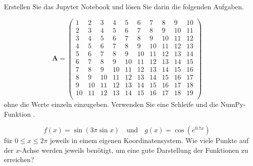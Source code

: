 \documentclass[12pt,parskip=full]{scrartcl}
\begin{document}

Erstellen Sie das Jupyter Notebook \uebdatei{} und lösen Sie darin die folgenden Aufgaben.

  \begin{displaymath}
    \mathbf{A}
    =
    \begin{pmatrix}
     1 &     2 &     3 &     4 &     5 &     6 &     7 &     8 &     9 &    10 \\
     2 &     3 &     4 &     5 &     6 &     7 &     8 &     9 &    10 &    11 \\
     3 &     4 &     5 &     6 &     7 &     8 &     9 &    10 &    11 &    12 \\
     4 &     5 &     6 &     7 &     8 &     9 &    10 &    11 &    12 &    13 \\
     5 &     6 &     7 &     8 &     9 &    10 &    11 &    12 &    13 &    14 \\
     6 &     7 &     8 &     9 &    10 &    11 &    12 &    13 &    14 &    15 \\
     7 &     8 &     9 &    10 &    11 &    12 &    13 &    14 &    15 &    16 \\
     8 &     9 &    10 &    11 &    12 &    13 &    14 &    15 &    16 &    17 \\
     9 &    10 &    11 &    12 &    13 &    14 &    15 &    16 &    17 &    18 \\
    10 &    11 &    12 &    13 &    14 &    15 &    16 &    17 &    18 &    19 \\
    \end{pmatrix}
  \end{displaymath}  
  ohne die Werte einzeln einzugeben. Verwenden Sie eine Schleife und die NumPy-Funktion .



  \begin{displaymath}
    f(x) = \sin(3 \pi \sin x)
    \quad \text{und} \quad
    g(x) = \cos(e^{0.7 x})
  \end{displaymath}
  für $0 \leq x \leq 2 \pi$ jeweils in einem eigenen Koordinatensystem. Wie viele Punkte auf der $x$-Achse werden jeweils benötigt, um eine gute Darstellung der Funktionen zu erreichen?

\clearpage
\end{document}
